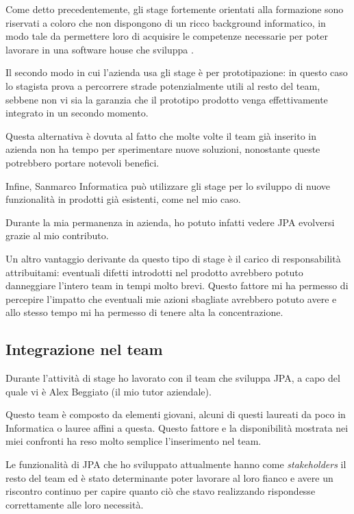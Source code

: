 Come detto precedentemente, gli stage fortemente orientati alla formazione
sono riservati a coloro che non dispongono di un ricco background informatico,
in modo tale da permettere loro di acquisire le competenze necessarie per
poter lavorare in una software house che sviluppa .

Il secondo modo in cui l'azienda usa gli stage è per prototipazione: in questo
caso lo stagista prova a percorrere strade potenzialmente utili al resto del
team, sebbene non vi sia la garanzia che il prototipo prodotto venga
effettivamente integrato in un secondo momento.

Questa alternativa è dovuta al fatto che molte volte il team già inserito in
azienda non ha tempo per sperimentare nuove soluzioni, nonostante queste
potrebbero portare notevoli benefici.

Infine, Sanmarco Informatica può utilizzare gli stage per lo sviluppo di nuove
funzionalità in prodotti già esistenti, come nel mio caso.

Durante la mia permanenza in azienda, ho potuto infatti vedere JPA evolversi
grazie al mio contributo.

Un altro vantaggio derivante da questo tipo di stage è il carico di
responsabilità attribuitami: eventuali difetti introdotti nel prodotto
avrebbero potuto danneggiare l'intero team in tempi molto brevi. Questo
fattore mi ha permesso di percepire l'impatto che eventuali mie azioni
sbagliate avrebbero potuto avere e allo stesso tempo mi ha permesso di tenere
alta la concentrazione.

\subsection{Integrazione nel team}
Durante l'attività di stage ho lavorato con il team che sviluppa JPA, a capo
del quale vi è Alex Beggiato (il mio tutor aziendale).

Questo team è composto da elementi giovani, alcuni di questi laureati da poco
in Informatica o lauree affini a questa. Questo fattore e la disponibilità
mostrata nei miei confronti ha reso molto semplice l'inserimento nel team.

Le funzionalità di JPA che ho sviluppato attualmente hanno come
\emph{stakeholders} il resto del team ed è stato determinante poter lavorare
al loro fianco e avere un riscontro continuo per capire quanto ciò che stavo
realizzando rispondesse correttamente alle loro necessità.

